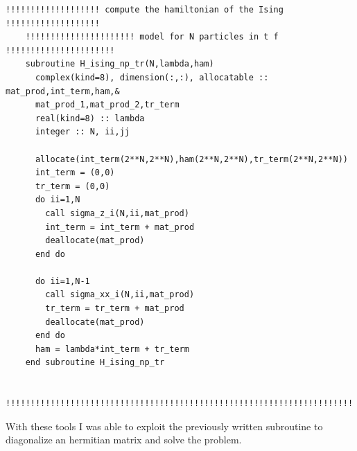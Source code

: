 \documentclass[prb,9pt,notitlepage]{revtex4-1}
\begin{document}
\begin{lstlisting}
!!!!!!!!!!!!!!!!!!! compute the hamiltonian of the Ising !!!!!!!!!!!!!!!!!!!
    !!!!!!!!!!!!!!!!!!!!!! model for N particles in t f !!!!!!!!!!!!!!!!!!!!!!
    subroutine H_ising_np_tr(N,lambda,ham)
      complex(kind=8), dimension(:,:), allocatable :: mat_prod,int_term,ham,&
      mat_prod_1,mat_prod_2,tr_term
      real(kind=8) :: lambda
      integer :: N, ii,jj

      allocate(int_term(2**N,2**N),ham(2**N,2**N),tr_term(2**N,2**N))
      int_term = (0,0)
      tr_term = (0,0)
      do ii=1,N
        call sigma_z_i(N,ii,mat_prod)
        int_term = int_term + mat_prod
        deallocate(mat_prod)
      end do

      do ii=1,N-1
        call sigma_xx_i(N,ii,mat_prod)
        tr_term = tr_term + mat_prod
        deallocate(mat_prod)
      end do
      ham = lambda*int_term + tr_term
    end subroutine H_ising_np_tr

    !!!!!!!!!!!!!!!!!!!!!!!!!!!!!!!!!!!!!!!!!!!!!!!!!!!!!!!!!!!!!!!!!!!!!!!!
\end{lstlisting}
With these tools I was able to exploit the previously written subroutine to diagonalize an hermitian matrix and solve the problem.
\end{document}
